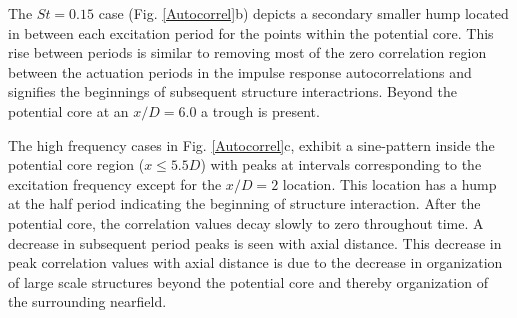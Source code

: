 \documentclass[english]{aiaa-tc}
\begin{document}
The $St=0.15$ case (Fig. \ref{Autocorrel}b) depicts a secondary smaller hump located in between each excitation period for the points within the potential core. This rise between periods is similar to removing most of the zero correlation region between the actuation periods in the impulse response autocorrelations and signifies the beginnings of subsequent structure interactrions. Beyond the potential core at an $x/D=6.0$ a trough is present. %

The high frequency cases in Fig. \ref{Autocorrel}c, exhibit a sine-pattern inside the potential core region ($x\leq5.5D$) with peaks at intervals corresponding to the excitation frequency except for the $x/D=2$ location. This location has a hump at the half period indicating the beginning of structure interaction. After the potential core, the correlation values decay slowly to zero throughout time. A decrease in subsequent period peaks is seen with axial distance. This decrease in peak correlation values with axial distance is due to the decrease in organization of large scale structures beyond the potential core and thereby organization of the surrounding nearfield. %
\end{document}
